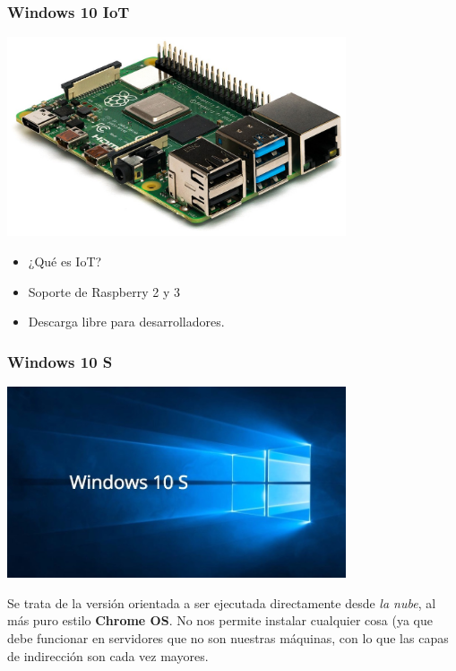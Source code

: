 \documentclass[11pt]{article}
\begin{document}
\newpage
\subsubsection{Windows 10 IoT}
\label{sec:org78f8869}

\begin{center}
\includegraphics[width=10cm]{./imgs/raspberry-pi.jpg}
\end{center}    

\begin{itemize}
\item ¿Qué es IoT?
\item Soporte de Raspberry 2 y 3
\item Descarga libre para desarrolladores.
\end{itemize}

\newpage
\subsubsection{Windows 10 S}
\label{sec:org7246748}

\begin{center}
\includegraphics[width=10cm]{./imgs/win10-s.jpg }
\end{center}
Se trata de la versión orientada a ser ejecutada directamente desde \emph{la nube}, al más puro estilo
\textbf{Chrome OS}. No nos permite instalar cualquier cosa (ya que debe funcionar en servidores que no
son nuestras máquinas, con lo que las capas de indirección son cada vez mayores.
\end{document}
